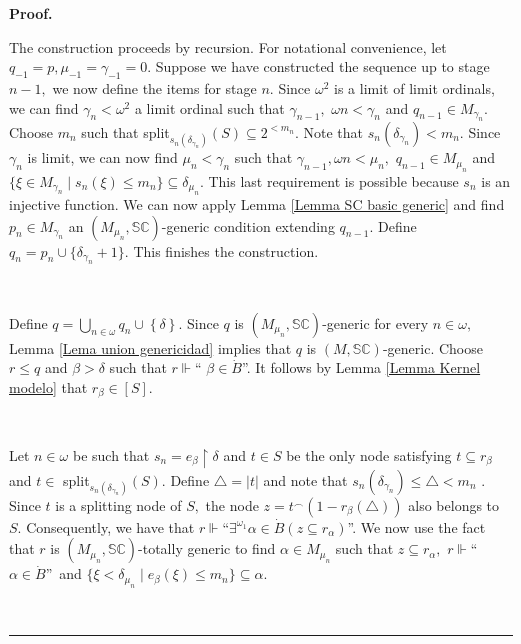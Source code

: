 \documentclass{article}
\newenvironment{proof}[1][Proof]{\noindent\textbf{#1.} }{\ \rule{0.5em}{0.5em}}
\begin{document}
\begin{proof}
\qquad\ \ \ \qquad\ \ \ 

The construction proceeds by recursion. For notational convenience, let
$q_{-1}=p,\mu_{-1}=\gamma_{-1}=0.$ Suppose we have constructed the sequence up
to stage $n-1,$ we now define the items for stage $n.$ Since $\omega^{2}$ is a
limit of limit ordinals, we can find $\gamma_{n}<\omega^{2}$ a limit ordinal
such that $\gamma_{n-1},$ $\omega n<\gamma_{n}$ and $q_{n-1}\in M_{\gamma_{n}%
}.$ Choose $m_{n}$ such that \textsf{split}$_{s_{n}\left(  \delta_{\gamma_{n}%
}\right)  }\left(  S\right)  \subseteq2^{<m_{n}}$. Note that $s_{n}\left(
\delta_{\gamma_{n}}\right)  <m_{n}.$ Since $\gamma_{n}$ is limit, we can now
find $\mu_{n}<\gamma_{n}$ such that $\gamma_{n-1},\omega n<\mu_{n},$
$q_{n-1}\in M_{\mu_{n}}$ and $\{\xi\in M_{\gamma_{n}}\mid s_{n}\left(
\xi\right)  \leq m_{n}\}\subseteq\delta_{\mu_{n}}.$ This last requirement is
possible because $s_{n}$ is an injective function. We can now apply Lemma
\ref{Lemma SC basic generic} and find $p_{n}\in M_{\gamma_{n}}$ an
$(M_{\mu_{n}},\mathbb{SC})$-generic condition extending $q_{n-1}$. Define
$q_{n}=p_{n}\cup\{\delta_{\gamma_{n}}+1\}.$ This finishes the construction.

\qquad\ \qquad\ \qquad\ \qquad\ 

Define $q=\bigcup\limits_{n\in\omega}q_{n}\cup\left\{  \delta\right\}  .$
Since $q$ is $(M_{\mu_{n}},\mathbb{SC})$-generic for every $n\in\omega,$ Lemma
\ref{Lema union genericidad} implies that $q$ is $(M,\mathbb{SC})$-generic.
Choose $r\leq q$ and $\beta>\delta$ such that $r\Vdash$\textquotedblleft%
$\beta\in\dot{B}$\textquotedblright. It follows by Lemma
\ref{Lemma Kernel modelo} that $r_{\beta}\in\left[  S\right]  .$

\qquad\ \qquad\ \qquad\ \qquad\ \ \ 

Let $n\in\omega$ be such that $s_{n}=e_{\beta}\upharpoonright\delta$ and $t\in
S$ be the only node satisfying $t\subseteq r_{\beta}$ and $t\in$
\textsf{split}$_{s_{n}\left(  \delta_{\gamma_{n}}\right)  }\left(  S\right)
.$ Define $\triangle=\left\vert t\right\vert $ and note that $s_{n}\left(
\delta_{\gamma_{n}}\right)  \leq\triangle<m_{n}$ . Since $t$ is a splitting
node of $S,$ the node $z=t^{\frown}\left(  1-r_{\beta}\left(  \triangle
\right)  \right)  $ also belongs to $S.$ Consequently, we have that $r\Vdash
$\textquotedblleft$\exists^{\omega_{1}}\alpha\in\dot{B}\left(  z\subseteq
r_{\alpha}\right)  $\textquotedblright. We now use the fact that $r$ is
$(M_{\mu_{n}},\mathbb{SC})$-totally generic to find $\alpha\in M_{\mu_{n}}$
such that $z\subseteq r_{\alpha},$ $r\Vdash$\textquotedblleft$\alpha\in\dot
{B}$\textquotedblright\ and $\{\xi<\delta_{\mu_{n}}\mid e_{\beta}\left(
\xi\right)  \leq m_{n}\}\subseteq\alpha.$


\end{proof}
\end{document}
